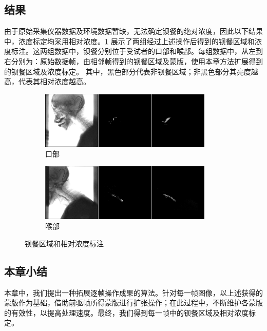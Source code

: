 \subsection{结果}

由于原始采集仪器数据及环境数据暂缺，无法确定钡餐的绝对浓度，因此以下结果中，浓度标定均采用相对浓度。\cref{fig:4_结果} 展示了两组经过上述操作后得到的钡餐区域和浓度标注。这两组数据中，钡餐分别位于受试者的口部和喉部。每组数据中，从左到右分别为：原始数据帧，由相邻帧得到的钡餐区域及蒙版，使用本章方法扩展得到的钡餐区域及浓度标定。
其中，黑色部分代表非钡餐区域；非黑色部分其亮度越高，代表其相对浓度越高。
\clearpage
\begin{figure}[!htp]
    \centering
    \begin{subfigure}{\textwidth}
        \centering
        \includegraphics[width=0.9\textwidth]{figures/421.png}
        \caption{口部}
    \end{subfigure}
    
    \begin{subfigure}{\textwidth}
        \centering
        \includegraphics[width=0.9\textwidth]{figures/422.png}
        \caption{喉部}
    \end{subfigure}
    \caption{钡餐区域和相对浓度标注}
    \label{fig:4_结果}
\end{figure}

\subsection{本章小结}

本章中，我们提出一种拓展逐帧操作成果的算法。针对每一帧图像，以上述获得的蒙版作为基础，借助前驱帧所得蒙版进行扩张操作；在此过程中，不断维护各蒙版的有效性，以提高处理速度。最终，我们得到每一帧中的钡餐区域及相对浓度标定。